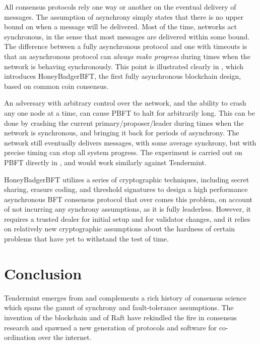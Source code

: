 All consensus protocols rely one way or another on the eventual delivery of messages.
The assumption of asynchrony simply states that there is no upper bound on when a message will be delivered.
Most of the time, networks act synchronous, in the sense that most messages are delivered within some bound.
The difference between a fully asynchronous protocol and one with timeouts is that 
an asynchronous protocol can \emph{always make progress} during times when the network is behaving synchronously.
This point is illustrated clearly in \cite{honeybadger}, which introduces HoneyBadgerBFT, 
the first fully asynchronous blockchain design, based on common coin consensus.

An adversary with arbitrary control over the network, 
and the ability to crash any one node at a time,
can cause PBFT to halt for arbitrarily long.
This can be done by crashing the current primary/proposer/leader during times when the network is synchronous,
and bringing it back for periods of asynchrony.
The network still eventually delivers messages, with some average synchrony,
but with precise timing can stop all system progress.
The experiment is carried out on PBFT directly in \cite{honeybadger}, and would work similarly against Tendermint.

HoneyBadgerBFT utilizes a series of cryptographic techniques, including secret sharing, erasure coding, 
and threshold signatures to design a high performance asynchronous BFT consensus protocol
that over comes this problem, on account of not incurring any synchrony assumptions, as it is fully leaderless.
However, it requires a trusted dealer for initial setup and for validator changes, 
and it relies on relatively new cryptographic assumptions about the hardness of certain problems that have 
yet to withstand the test of time.

\section{Conclusion}

Tendermint emerges from and complements a rich history of consensus science which spans the gamut of synchrony and fault-tolerance assumptions. 
The invention of the blockchain and of Raft have rekindled the fire in consensus research and spawned a new generation 
of protocols and software for co-ordination over the internet.

